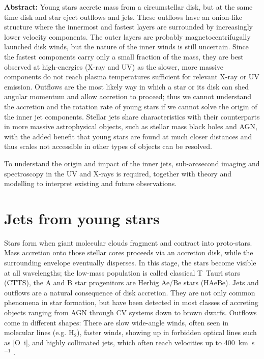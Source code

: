 \documentclass[12pt]{article}
\begin{document}
\textbf{Abstract:}
Young stars accrete mass from a circumstellar disk, but at the same time disk and star eject outflows and jets. These outflows have an onion-like structure where the innermost and fastest layers are surrounded by increasingly lower velocity components. The outer layers are probably magnetocentrifugally launched disk winds, but the nature of the inner winds is still uncertain. Since the fastest components carry only a small fraction of the mass, they are best observed at high-energies (X-ray and UV) as the  slower, more massive components do not reach plasma temperatures sufficient for relevant X-ray or UV emission. Outflows are the most likely way in which a star or its disk can shed angular momentum and allow accretion to proceed; thus we cannot understand the accretion and the rotation rate of young stars if we cannot solve the origin of the inner jet components. Stellar jets share characteristics with their counterparts in more massive astrophysical objects, such as stellar mass black holes and AGN, with the added benefit that young stars are found at much closer distances and thus scales not accessible in other types of objects can be resolved.

To understand the origin and impact of the inner jets, sub-arcsecond imaging and spectroscopy in the UV and X-rays is required, together with theory and modelling to interpret existing and future observations. 

\setlength{\parindent}{2em}

\pagebreak
\section{Jets from young stars}
Stars form when giant molecular clouds fragment and contract into
proto-stars. Mass accretion onto those stellar cores proceeds via an accretion
disk, while the surrounding envelope eventually disperses. In this stage, the
stars become visible at all wavelengths; the low-mass population is called
classical T~Tauri stars (CTTS), the A and B star progenitors are Herbig Ae/Be
stars (HAeBe). Jets and outflows are a natural consequence of disk
accretion. They are not only common phenomena in star formation, but have been
detected in most classes of accreting objects ranging from AGN through CV
systems down to brown dwarfs. Outflows come in different shapes: There are slow
wide-angle winds, often seen in molecular lines (e.g. H$_2$), faster winds,
showing up in forbidden optical lines such as [O~{\sc i}], and highly collimated jets, which often reach velocities up to 400~km~s$^{-1}$ \citep{1998AJ....115.1554E}. 
\end{document}
